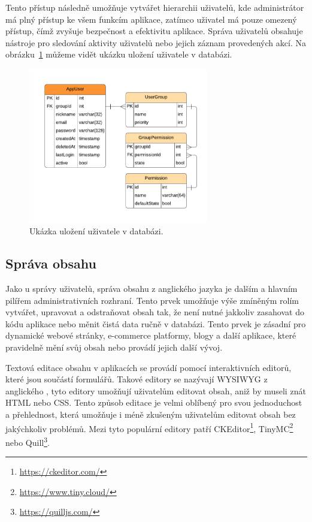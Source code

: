 Tento přístup následně umožňuje vytvářet hierarchii uživatelů, kde administrátor má plný přístup ke všem funkcím aplikace, zatímco uživatel má pouze omezený přístup, čímž zvyšuje bezpečnost a efektivitu aplikace. Správa uživatelů obsahuje nástroje pro sledování aktivity uživatelů nebo jejich záznam provedených akcí. Na obrázku~\ref{fig:user-management} můžeme vidět ukázku uložení uživatele v databázi.

\begin{figure}[H]
    \centering
    \includegraphics[width=0.7\textwidth]{diagrams/userManagement}
    \caption{Ukázka uložení uživatele v databázi. \cite{responsive_design}}
    \label{fig:user-management}
\end{figure}

\subsection{Správa obsahu}
\label{subsec:admin-elements-content-management}
Jako u správy uživatelů, správa obsahu z anglického jazyka \textit{} je dalším a hlavním pilířem administrativních rozhraní. Tento prvek umožňuje výše zmíněným rolím vytvářet, upravovat a odstraňovat obsah tak, že není nutné jakkoliv zasahovat do kódu aplikace nebo měnit čistá data ručně v databázi. Tento prvek je zásadní pro dynamické webové stránky, e-commerce platformy, blogy a další aplikace, které pravidelně mění svůj obsah nebo provádí jejich další vývoj.

Textová editace obsahu v aplikacích se provádí pomocí interaktivních editorů, které jsou součástí formulářů. Takové editory se nazývají WYSIWYG z anglického \textit{}, tyto editory umožňují uživatelům editovat obsah, aniž by museli znát HTML nebo CSS. Tento způsob editace je velmi oblíbený pro svou jednoduchost a přehlednost, která umožňuje i méně zkušeným uživatelům editovat obsah bez jakýchkoliv problémů. Mezi tyto populární editory patří CKEditor\footnote[1]{\url{https://ckeditor.com/}}, TinyMC\footnote[2]{\url{https://www.tiny.cloud/}} nebo Quill\footnote[3]{\url{https://quilljs.com/}}.

